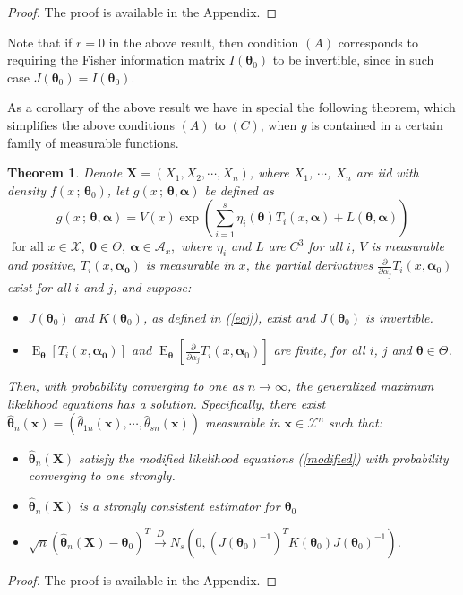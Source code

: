 \documentclass[10pt,a4paper,onecolumn]{article} %
\newcommand{\f}{\on}
\newtheorem{theorem}{Theorem}[section]
\newcommand{\bs}{\boldsymbol}
\newcommand{\on}{\operatorname}
\begin{document}
\begin{proof} The proof is available in the Appendix.
 \end{proof}

Note that if $r=0$ in the above result, then condition $(A)$ corresponds to requiring the Fisher information matrix $I(\bs{\theta}_0)$ to be invertible, since in such case $J(\bs{\theta}_0)=I(\bs{\theta}_0)$.

As a corollary of the above result we have in special the following theorem, which simplifies the above conditions $(A)$ to $(C)$, when $g$ is contained in a certain family of measurable functions.

\begin{theorem}\label{princ} Denote $\bs{X}=\left(X_1, X_2, \cdots, X_n\right)$, where $X_1$, $\cdots$, $X_n$ are iid with density $f(x\,;\,\bs{\theta}_0)$, let $g(x\,;\,\bs{\theta},\bs{\alpha})$ be defined as
\begin{equation*}g(x\,;\,\bs{\theta},\bs{\alpha})=V(x)\exp\left(\sum_{i=1}^s \eta_i(\bs{\theta})T_i(x,\bs{\alpha})+L(\bs{\theta},\bs{\alpha})\right)
\end{equation*}
$\mbox{ for all }x\in \mathcal{X},\ \bs{\theta}\in \Theta,\ \bs{\alpha}\in \mathcal{A}_x,$ where $\eta_i$ and $L$ are $C^3$ for all $i$, $V$ is  measurable and positive,  $T_i(x,\bs{\alpha_0})$ is measurable in $x$, the partial derivatives $\frac{\partial}{\partial \alpha_j} T_i(x,\bs{\alpha}_0)$ exist for all $i$ and $j$, and suppose:
\begin{itemize}
\item[(A)]  $J(\bs{\theta}_0)$ and $K(\bs{\theta}_0)$, as defined in (\ref{eqj}), exist and $J(\bs{\theta}_0)$ is invertible.
\item[(B)] $\f{E}_{\bs{\theta}}\left[T_i(x,\bs{\alpha_0})\right]$ and $\f{E}_{\bs{\theta}}\left[\frac{\partial}{\partial \alpha_j} T_i(x,\bs{\alpha}_0)\right]$ are finite, for all $i$, $j$ and $\bs{\theta}\in \Theta$.
\end{itemize}
Then, with probability converging to one as $n\to \infty$, the generalized maximum likelihood equations has a solution. Specifically, there exist  $\bs{\hat{\theta}}_n(\bs{x})=(\hat{\theta}_{1n}(\bs{x}),\cdots,\hat{\theta}_{sn}(\bs{x}))$ measurable in $\bs{x}\in \mathcal{X}^n$ such that:
\begin{itemize}
\item[I)] $\bs{\hat{\theta}}_n(\bs{X})$ satisfy the modified likelihood equations (\ref{modified}) with probability converging to one strongly.
\item[II)] $\bs{\hat{\theta}}_n(\bs{X})$ is a strongly consistent estimator for $\bs{\theta}_0$
\item[III)]
$\sqrt{n}(\bs{\hat{\theta}}_n(\bs{X})-\bs{\theta}_0)^T\overset{D}{\to} N_s\left(0,(J(\bs{\theta}_0)^{-1})^T K(\bs{\theta}_0)J(\bs{\theta}_0)^{-1}\right)$.
\end{itemize}
\end{theorem}
\begin{proof} The proof is available in the Appendix.
 \end{proof}
\end{document}
